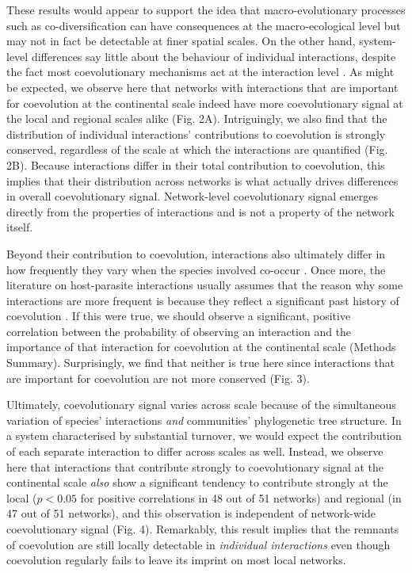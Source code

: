 These results would appear to support the idea that macro-evolutionary
processes such as co-diversification can have consequences at the
macro-ecological level but may not in fact be detectable at finer
spatial scales. On the other hand, system-level differences say little
about the behaviour of individual interactions, despite the fact most
coevolutionary mechanisms act at the interaction level \citep{thom99}.
As might be expected, we observe here that networks with interactions
that are important for coevolution at the continental scale indeed have
more coevolutionary signal at the local and regional scales alike (Fig.
2A). Intriguingly, we also find that the distribution of individual
interactions' contributions to coevolution is strongly conserved,
regardless of the scale at which the interactions are quantified (Fig.
2B). Because interactions differ in their total contribution to
coevolution, this implies that their distribution across networks is
what actually drives differences in overall coevolutionary signal.
Network-level coevolutionary signal emerges directly from the properties
of interactions and is not a property of the network itself.

Beyond their contribution to coevolution, interactions also ultimately
differ in how frequently they vary when the species involved co-occur
\citep{olit14}. Once more, the literature on host-parasite interactions
usually assumes that the reason why some interactions are more frequent
is because they reflect a significant past history of coevolution
\citep{mora10}. If this were true, we should observe a significant,
positive correlation between the probability of observing an interaction
and the importance of that interaction for coevolution at the
continental scale (Methods Summary). Surprisingly, we find that neither
is true here since interactions that are important for coevolution are
not more conserved (Fig. 3).

Ultimately, coevolutionary signal varies across scale because of the
simultaneous variation of species' interactions \emph{and} communities'
phylogenetic tree structure. In a system characterised by substantial
turnover, we would expect the contribution of each separate interaction
to differ across scales as well. Instead, we observe here that
interactions that contribute strongly to coevolutionary signal at the
continental scale \emph{also} show a significant tendency to contribute
strongly at the local (\(p<0.05\) for positive correlations in 48 out of
51 networks) and regional (in 47 out of 51 networks), and this
observation is independent of network-wide coevolutionary signal (Fig.
4). Remarkably, this result implies that the remnants of coevolution are
still locally detectable in \emph{individual interactions} even though
coevolution regularly fails to leave its imprint on most local networks.

